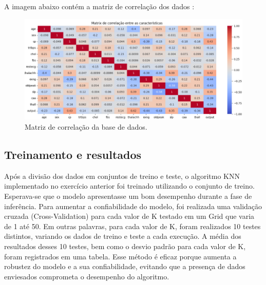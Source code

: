 \documentclass{article} %
\begin{document}
\vspace{1cm}

A imagem abaixo contém a matriz de correlação dos dados : 

\vspace{1cm}

\begin{figure}[h] %
    \centering %
    \includegraphics[width=1\linewidth]{corr_matrix.png} %
    \caption{Matriz de correlação da base de dados.} %
    \label{fig:exemplo} %
\end{figure}

\newpage

\subsection{Treinamento e resultados}

Após a divisão dos dados em conjuntos de treino e teste, o algoritmo KNN implementado no exercício anterior foi treinado utilizando o conjunto de treino. Esperava-se que o modelo apresentasse um bom desempenho durante a fase de inferência. Para aumentar a confiabilidade do modelo, foi realizada uma validação cruzada (Cross-Validation) para cada valor de K testado em um Grid que varia de 1 até 50. Em outras palavras, para cada valor de K, foram realizados 10 testes distintos, variando os dados de treino e teste a cada execução. A média dos resultados desses 10 testes, bem como o desvio padrão para cada valor de K, foram registrados em uma tabela. Esse método é eficaz porque aumenta a robustez do modelo e a sua confiabilidade, evitando que a presença de dados enviesados comprometa o desempenho do algoritmo.

\vspace{1cm}
\end{document}
